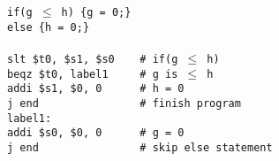 \documentclass[a4paper]{article}
\begin{document}
\begin{enumerate}
			\texttt{if(g $\le$  h) \{g = 0;\}\\
			else \{h = 0;\}}\\\\
			\texttt{slt \$t0, \$s1, \$s0\ \ \ \ \# if(g $\le$ h)\\
				beqz \$t0, label1\ \ \ \ \ \# g is $\le$ h\\
                                addi \$s1, \$0, 0\ \ \ \ \ \ \# h = 0\\
                                j end\ \ \ \ \ \ \ \ \ \ \ \ \ \ \ \ \# finish program\\
				label1:\\
				addi \$s0, \$0, 0\ \ \ \ \ \ \# g = 0\\
				j end\ \ \ \ \ \ \ \ \ \ \ \ \ \ \ \ \# skip else statement\\}
				
	\end{enumerate}
\end{document}
